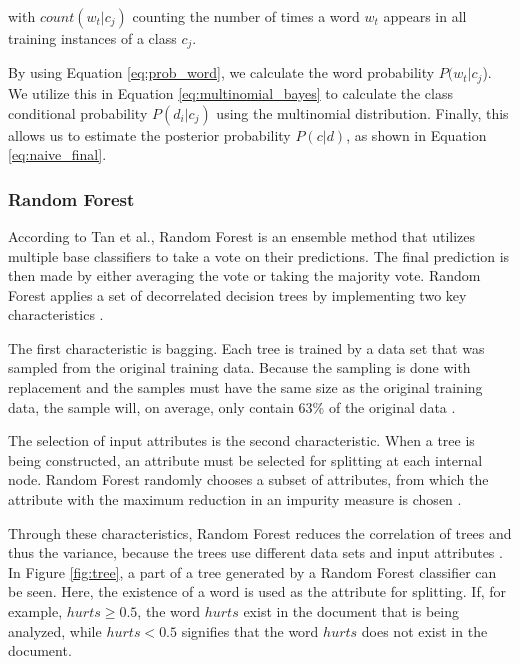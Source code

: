         with $count(w_t|c_j)$ counting the number of times a word $w_t$ appears in all training instances of a class $c_j$.
        
        By using Equation \eqref{eq:prob_word}, we calculate the word probability $P(w_t|c_j$). We utilize this in Equation \eqref{eq:multinomial_bayes} to calculate the class conditional probability $P(d_i|c_j)$ using the multinomial distribution. Finally, this allows us to estimate the posterior probability $P(c|d)$, as shown in Equation \eqref{eq:naive_final}.
        
\subsubsection{Random Forest}
        According to Tan et al., Random Forest is an ensemble method that utilizes multiple base classifiers to take a vote on their predictions. The final prediction is then made by either averaging the vote or taking the majority vote. Random Forest applies a set of decorrelated decision trees by implementing two key characteristics \cite{DBLP:books/aw/TanSKK2019}.
        
        The first characteristic is bagging. Each tree is trained by a data set that was sampled from the original training data. Because the sampling is done with replacement and the samples must have the same size as the original training data, the sample will, on average, only contain 63\% of the original data \cite{DBLP:books/aw/TanSKK2019}.
        
        The selection of input attributes is the second characteristic. When a tree is being constructed, an attribute must be selected for splitting at each internal node. Random Forest randomly chooses a subset of attributes, from which the attribute with the maximum reduction in an impurity measure is chosen \cite{DBLP:books/aw/TanSKK2019}.
        
        Through these characteristics, Random Forest reduces the correlation of trees and thus the variance, because the trees use different data sets and input attributes \cite{DBLP:books/aw/TanSKK2019}. In Figure \ref{fig:tree}, a part of a tree generated by a Random Forest classifier can be seen. Here, the existence of a word is used as the attribute for splitting. If, for example, $hurts \geq 0.5$, the word $hurts$ exist in the document that is being analyzed, while $hurts < 0.5$ signifies that the word $hurts$ does not exist in the document.
        
